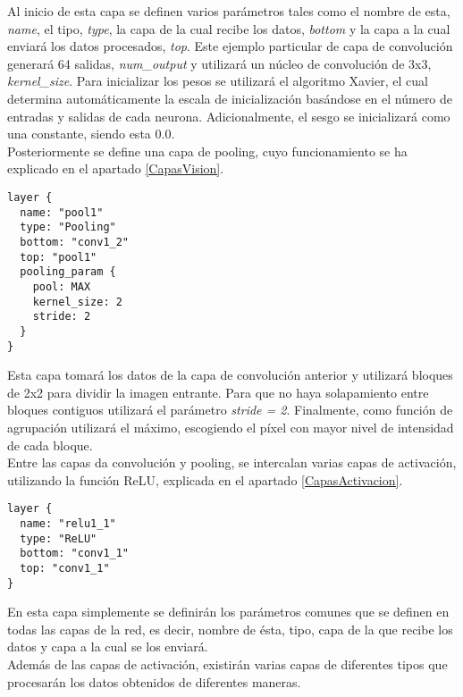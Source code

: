 \documentclass[a4paper, 12pt, oneside]{book}
\begin{document}
Al inicio de esta capa se definen varios parámetros tales como el nombre de esta, \textit{name}, el tipo, \textit{type}, la capa de la cual recibe los datos, \textit{bottom} y la capa a la cual enviará los datos procesados, \textit{top}. Este ejemplo particular de capa de convolución generará 64 salidas, \textit{num\_output} y utilizará un núcleo de convolución de 3x3, \textit{kernel\_size}. Para inicializar los pesos se utilizará el algoritmo Xavier, el cual determina automáticamente la escala de inicialización basándose en el número de entradas y salidas de cada neurona. Adicionalmente, el sesgo se inicializará como una constante, siendo esta 0.0.\\

Posteriormente se define una capa de pooling, cuyo funcionamiento se ha explicado en el apartado \ref{CapasVision}.\\

\begin{lstlisting}[frame=single]
layer {
  name: "pool1"
  type: "Pooling"
  bottom: "conv1_2"
  top: "pool1"
  pooling_param {
    pool: MAX
    kernel_size: 2
    stride: 2
  }
}
\end{lstlisting}

Esta capa tomará los datos de la capa de convolución anterior y utilizará bloques de 2x2 para dividir la imagen entrante. Para que no haya solapamiento entre bloques contiguos utilizará el parámetro \textit{stride = 2}. Finalmente, como función de agrupación utilizará el máximo, escogiendo el píxel con mayor nivel de intensidad de cada bloque.\\

Entre las capas da convolución y pooling, se intercalan varias capas de activación, utilizando la función ReLU, explicada en el apartado \ref{CapasActivacion}.\\

\begin{lstlisting}[frame=single]
layer {
  name: "relu1_1"
  type: "ReLU"
  bottom: "conv1_1"
  top: "conv1_1"
}
\end{lstlisting}

En esta capa simplemente se definirán los parámetros comunes que se definen en todas las capas de la red, es decir, nombre de ésta, tipo, capa de la que recibe los datos y capa a la cual se los enviará.\\

Además de las capas de activación, existirán varias capas de diferentes tipos que procesarán los datos obtenidos de diferentes maneras.
\end{document}
